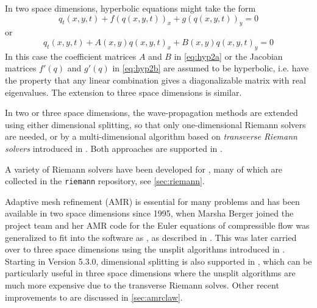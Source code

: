 In two space dimensions, hyperbolic equations might take the form
\begin{equation}\label{eq:hyp2a}
q_t(x,y,t) + f(q(x,y,t))_x + g(q(x,y,t))_y = 0
\end{equation}
or
\begin{equation}\label{eq:hyp2b}
q_t(x,y,t) + A(x,y)q(x,y,t)_x + B(x,y)q(x,y,t)_y = 0
\end{equation} 
In this case the
coefficient matrices $A$ and $B$ in \cref{eq:hyp2a} or the Jacobian matrices
$f'(q)$ and $g'(q)$ in \cref{eq:hyp2b} are assumed to be hyperbolic, i.e. have
the property that any
linear combination gives a diagonalizable matrix with real eigenvalues.
The extension to three space dimensions is similar.

In two or three space dimensions, the wave-propagation methods
are extended using either dimensional splitting, so that only
one-dimensional Riemann solvers are needed, or by a multi-dimensional
algorithm based on {\em transverse Riemann solvers} introduced in 
\cite{rjl:wpalg}.  Both approaches are supported in \clawpack.

A variety of Riemann solvers have been developed for \clawpack, many of which
are collected in the \texttt{riemann} repository, see \cref{sec:riemann}.

Adaptive mesh refinement (AMR) is essential for many problems and 
has been available in two space dimensions
since 1995, when Marsha Berger joined the project team and her AMR
code for the Euler equations of compressible flow was generalized to fit into
the software as \amrclaw, as described in \cite{Berger:1998ia}.  This was
later carried over to three space dimensions using the unsplit algorithms
introduced in \cite{jol-rjl:3d}.  Starting in Version 5.3.0, dimensional
splitting is also supported in \amrclaw, which can be particularly useful in
three space dimensions where the unsplit algorithms are much more expensive
due to the transverse Riemann solves.  Other recent improvements to \amrclaw
are discussed in \cref{sec:amrclaw}.

